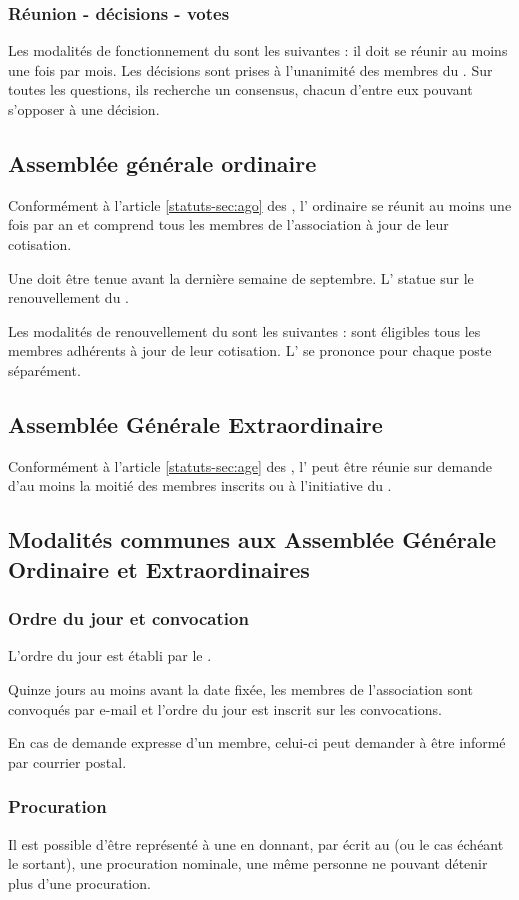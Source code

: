 \documentclass[a4paper,french,10pt]{article}
\newcommand{\article}[1]{\subsection{#1}\addtocounter{article}{1}}
\newcounter{article}
\newcommand{\artrefst}[1]{article \ref{statuts-#1} des \statuts{}}
\begin{document}
\subsubsection*{Réunion - décisions - votes}

Les modalités de fonctionnement du \bureau{} sont les suivantes : il
doit se réunir au moins une fois par mois. Les décisions sont
prises à l'unanimité des membres du \bureau{}. Sur toutes les questions,
ils recherche un consensus, chacun d’entre eux pouvant s’opposer à
une décision.

\article{Assemblée générale ordinaire}
\label{sec:assembl-gener-ordin}
Conformément à l'\artrefst{sec:ago}, l’\AG{} ordinaire se réunit au moins une fois par an et comprend tous les membres de l’association à jour de leur cotisation.

Une \AG{} doit être tenue avant la dernière semaine de septembre. L'\AG{} statue sur le renouvellement du \bureau{}.

Les modalités de renouvellement du \bureau{} sont les suivantes : sont éligibles tous les membres adhérents à jour de leur cotisation. L'\AG{} se prononce pour chaque poste séparément.

\article{Assemblée Générale Extraordinaire}
\label{sec:age}
Conformément à l'\artrefst{sec:age}, l'\AGE{} peut être réunie sur demande d'au moins la moitié des membres inscrits ou à l'initiative du \bureau{}.

\article{Modalités communes aux Assemblée Générale Ordinaire et Extraordinaires}
\label{sec:ag}

\subsubsection*{Ordre du jour et convocation}

L'ordre du jour est établi par le \bureau{}.

Quinze jours au moins avant la date fixée, les membres de
l’association sont convoqués par e-mail et l’ordre du jour est inscrit
sur les convocations.

En cas de demande expresse d'un membre, celui-ci peut demander à être
informé par courrier postal.

\subsubsection*{Procuration}

Il est possible d’être représenté à une \AG{} en donnant,
par écrit au \bureau{} (ou le cas échéant le \bureau{} sortant), une procuration nominale, une même personne ne pouvant détenir plus
d’une procuration.
\end{document}
